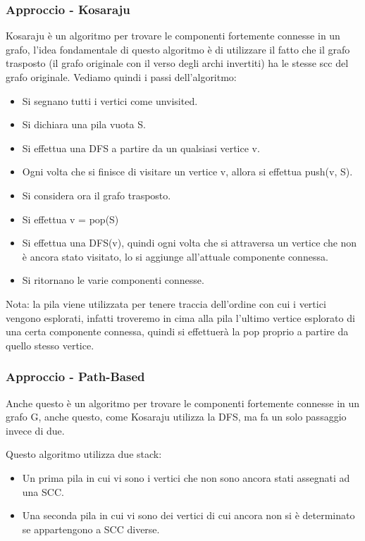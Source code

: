 \documentclass[12pt,a4paper]{article}
\begin{document}
\subsubsection{Approccio - Kosaraju}
Kosaraju è un algoritmo per trovare le componenti fortemente connesse in un grafo, l'idea fondamentale di questo algoritmo  è di utilizzare il fatto che il grafo trasposto (il grafo originale con il verso degli archi invertiti) ha le stesse scc del grafo originale. Vediamo quindi i passi dell'algoritmo:
\begin{itemize}
\item Si segnano tutti i vertici come unvisited.
\item Si dichiara una pila vuota S.
\item Si effettua una DFS a partire da un qualsiasi vertice v.
\item Ogni volta che si finisce di visitare un vertice v, allora si effettua push(v, S).
\item Si considera ora il grafo trasposto.
\item Si effettua v = pop(S)
\item Si effettua una DFS(v), quindi ogni volta che si attraversa un vertice che non è ancora stato visitato, lo si aggiunge all'attuale componente connessa.
\item Si ritornano le varie componenti connesse.
\end{itemize}
Nota: la pila viene utilizzata per tenere traccia dell'ordine con cui i vertici vengono esplorati, infatti troveremo in cima alla pila l'ultimo vertice esplorato di una certa componente connessa, quindi si effettuerà la pop proprio a partire da quello stesso vertice.

\subsubsection{Approccio - Path-Based}
Anche questo è un algoritmo per trovare le componenti fortemente connesse in un grafo G, anche questo, come Kosaraju utilizza la DFS, ma fa un solo passaggio invece di due.

Questo algoritmo utilizza due stack:
\begin{itemize}
\item Un prima pila in cui vi sono i vertici che non sono ancora stati assegnati ad una SCC.
\item Una seconda pila in cui vi sono dei vertici di cui ancora non si è determinato se appartengono a SCC diverse.
\end{itemize}
\end{document}
